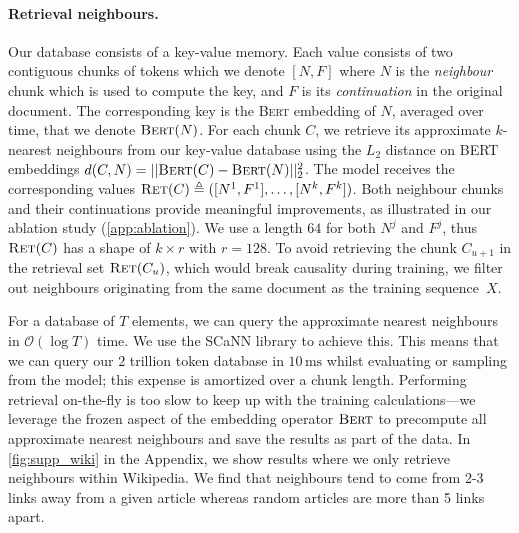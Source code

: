\documentclass[11pt, a4paper, logo]{deepmind}
\newcommand{\ret}{\textsc{Ret}}
\newcommand{\bert}{\textsc{Bert}\xspace}
\begin{document}
\paragraph{Retrieval neighbours.} Our database consists of a key-value memory. Each value consists of two contiguous chunks of tokens which we denote $[N, F]$ where $N$ is the \textit{neighbour} chunk which is used to compute the key, and $F$ is its \textit{continuation} in the original document. The corresponding key is the \bert embedding of $N$, averaged over time, that we denote $\bert(N)$. For each chunk $C$, we retrieve its approximate $k$-nearest neighbours from our key-value database using the $L_2$ distance on BERT embeddings $d(C, N) = ||\bert(C) - \bert(N)||_2^2$. The model receives the corresponding values $\ret(C) \triangleq ([N^1, F^1], \dots,  [N^k, F^k])$. Both neighbour chunks and their continuations provide meaningful improvements, as illustrated in our ablation study (\autoref{app:ablation}). We use a length $64$ for both $N^j$ and $F^j$, thus $\ret(C)$ has a shape of $k \times r$ with $r=128$.
To avoid retrieving the chunk $C_{u+1}$ in the retrieval set $\ret(C_u)$, which would break causality during training, we filter out neighbours originating from the same document as the training sequence~$X$.  

For a database of $T$ elements, we can query the approximate nearest neighbours in $\mathcal{O}(\log T)$ time. We use the SCaNN library \citep{avq_2020} to achieve this. This means that we can query our $2$ trillion token database in $10\,\textrm{ms}$ whilst evaluating or sampling from the model; this expense is amortized over a chunk length.
Performing retrieval on-the-fly is too slow to keep up with the training calculations---we leverage the frozen aspect of the embedding operator $\bert$ to precompute all approximate nearest neighbours and save the results as part of the data. 
In \autoref{fig:supp_wiki} in the Appendix, we show results where we only retrieve neighbours within Wikipedia. We find that neighbours tend to come from 2-3 links away from a given article whereas random articles are more than 5 links apart.
\end{document}

